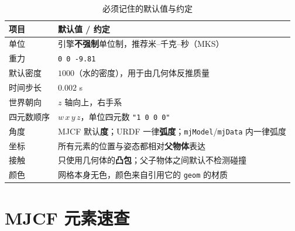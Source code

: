 \begin{table}[H]
	\centering
	\caption{必须记住的默认值与约定}
	\label{tab:App:默认值}
	\footnotesize
	\begin{tabular}{>{\raggedright\arraybackslash}p{4.6cm}>{\raggedright\arraybackslash}p{9.6cm}}
		\hline
		项目 & 默认值 / 约定 \\
		\hline
		单位 & 引擎\textbf{不强制}单位制，推荐米--千克--秒（MKS） \\
		重力 & \texttt{0 0 -9.81} \\
		默认密度 & $1000$（水的密度），用于由几何体反推质量 \\
		时间步长 & $0.002$ s \\
		世界朝向 & $z$ 轴向上，右手系 \\
		四元数顺序 & $w\,x\,y\,z$，单位四元数 \texttt{"1 0 0 0"} \\
		角度 & MJCF 默认\textbf{度}；URDF 一律\textbf{弧度}；\texttt{mjModel}/\texttt{mjData} 内一律弧度 \\
		坐标 & 所有元素的位置与姿态都相对\textbf{父物体}表达 \\
		接触 & 只使用几何体的\textbf{凸包}；父子物体之间默认不检测碰撞 \\
		颜色 & 网格本身无色，颜色来自引用它的 \texttt{geom} 的材质 \\
		\hline
	\end{tabular}
\end{table}

\section{MJCF 元素速查}

